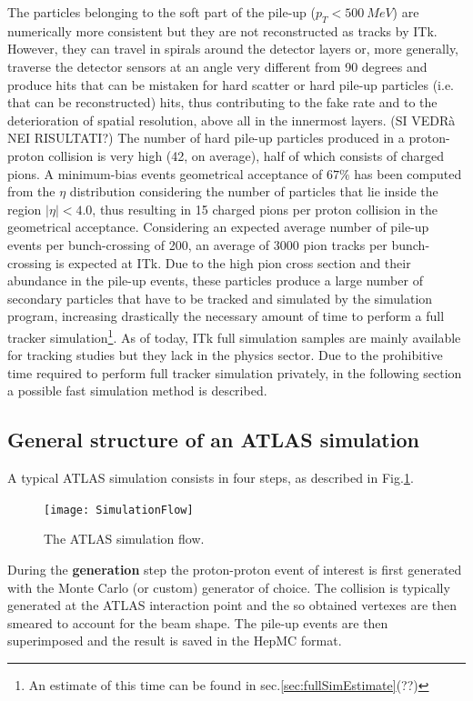 \documentclass[a4paper,twoside,12pt]{article}
\begin{document}
The particles belonging to the soft part of the pile-up ($p_{T} < 500\ MeV$) are numerically more consistent but 
they are not reconstructed as tracks by ITk. However, they can travel in spirals around the 
detector layers or, more generally, traverse the detector sensors at an angle very different
from 90 degrees and produce hits that can be mistaken for hard scatter or hard pile-up particles
(i.e. that can be reconstructed) hits, thus contributing to the fake rate and to the
deterioration of spatial resolution, above all in the innermost layers. (SI VEDRà NEI RISULTATI?)
The number of hard pile-up particles produced in a proton-proton collision is very high (42, on average), 
half of which consists of charged pions. A minimum-bias events geometrical acceptance of $67\%$ has 
been computed from the $\eta$ distribution considering the number of particles that 
lie inside the region $|\eta| < 4.0$, thus resulting in 15 charged pions per proton collision in 
the geometrical acceptance. Considering an expected average number of pile-up events per bunch-crossing of 200, an average of 3000 pion tracks per bunch-crossing is expected at ITk.
Due to the high pion cross section and their abundance in the pile-up events, these particles produce
a large number of secondary particles that have to be tracked and simulated by the simulation
program, increasing drastically the necessary amount of time to perform a full tracker simulation\footnote{An estimate of this time can be found in sec.\ref{sec:fullSimEstimate}(??)}. As of today, ITk full simulation samples are mainly available for tracking studies but they
lack in the physics sector. Due to the prohibitive time required to perform full tracker 
simulation privately, in the following section a possible fast simulation method is described.

\subsection{General structure of an ATLAS simulation}
A typical ATLAS simulation consists in four steps, as described in Fig.\ref{fig:simulationFlow}.

\begin{figure} [h]
	\texttt{[image: SimulationFlow]}
	\caption{The ATLAS simulation flow. }
	\label{fig:simulationFlow}
\end{figure}

During the \textbf{generation} step the proton-proton event of interest is first generated with the Monte
Carlo (or custom) generator of choice. The collision is typically generated at the ATLAS 
interaction point and the so obtained vertexes are then smeared to account for the beam 
shape. The pile-up events are then superimposed and
the result is saved in the HepMC format. \\
\end{document}
